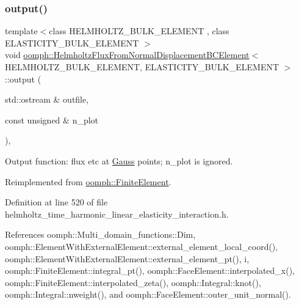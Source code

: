 \subsubsection{\texorpdfstring{output()}{output()}\hspace{0.1cm}{\footnotesize\ttfamily [2/4]}}
{\footnotesize\ttfamily template$<$class H\+E\+L\+M\+H\+O\+L\+T\+Z\+\_\+\+B\+U\+L\+K\+\_\+\+E\+L\+E\+M\+E\+NT , class E\+L\+A\+S\+T\+I\+C\+I\+T\+Y\+\_\+\+B\+U\+L\+K\+\_\+\+E\+L\+E\+M\+E\+NT $>$ \\
void \hyperlink{classoomph_1_1HelmholtzFluxFromNormalDisplacementBCElement}{oomph\+::\+Helmholtz\+Flux\+From\+Normal\+Displacement\+B\+C\+Element}$<$ H\+E\+L\+M\+H\+O\+L\+T\+Z\+\_\+\+B\+U\+L\+K\+\_\+\+E\+L\+E\+M\+E\+NT, E\+L\+A\+S\+T\+I\+C\+I\+T\+Y\+\_\+\+B\+U\+L\+K\+\_\+\+E\+L\+E\+M\+E\+NT $>$\+::output (\begin{DoxyParamCaption}\item[{std\+::ostream \&}]{outfile,  }\item[{const unsigned \&}]{n\+\_\+plot }\end{DoxyParamCaption})\hspace{0.3cm}{\ttfamily [inline]}, {\ttfamily [virtual]}}



Output function\+: flux etc at \hyperlink{classoomph_1_1Gauss}{Gauss} points; n\+\_\+plot is ignored. 



Reimplemented from \hyperlink{classoomph_1_1FiniteElement_afa9d9b2670f999b43e6679c9dd28c457}{oomph\+::\+Finite\+Element}.



Definition at line 520 of file helmholtz\+\_\+time\+\_\+harmonic\+\_\+linear\+\_\+elasticity\+\_\+interaction.\+h.



References oomph\+::\+Multi\+\_\+domain\+\_\+functions\+::\+Dim, oomph\+::\+Element\+With\+External\+Element\+::external\+\_\+element\+\_\+local\+\_\+coord(), oomph\+::\+Element\+With\+External\+Element\+::external\+\_\+element\+\_\+pt(), i, oomph\+::\+Finite\+Element\+::integral\+\_\+pt(), oomph\+::\+Face\+Element\+::interpolated\+\_\+x(), oomph\+::\+Finite\+Element\+::interpolated\+\_\+zeta(), oomph\+::\+Integral\+::knot(), oomph\+::\+Integral\+::nweight(), and oomph\+::\+Face\+Element\+::outer\+\_\+unit\+\_\+normal().

\mbox{\label{classoomph_1_1HelmholtzFluxFromNormalDisplacementBCElement_ae75706159d926cbad94fe66fa607b1fe}} 
